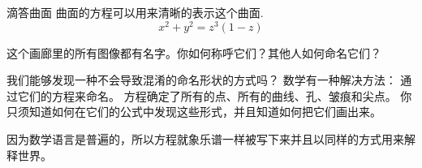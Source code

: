 ﻿\begin{surferPage}{滴答曲面}
曲面的方程可以用来清晰的表示这个曲面. \\
\smallskip
\[x^2 + y^2	= z^3	(1 - z) \]

\singlespacing

这个画廊里的所有图像都有名字。你如何称呼它们？其他人如何命名它们？\\

\vspace{0.3cm}

我们能够发现一种不会导致混淆的命名形状的方式吗？ 数学有一种解决方法： 通过它们的方程来命名。 方程确定了所有的点、所有的曲线、孔、皱痕和尖点。 你只须知道如何在它们的公式中发现这些形式，并且知道如何把它们画出来。\\

\vspace{0.3cm}

因为数学语言是普遍的，所以方程就象乐谱一样被写下来并且以同样的方式用来解释世界。
\end{surferPage}

